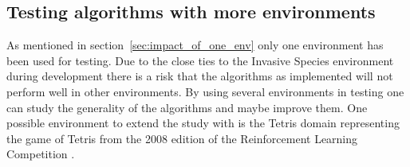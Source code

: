 \subsection{Testing algorithms with more environments}

As mentioned in section~\ref{sec:impact_of_one_env} only one environment has been
used for testing. Due to the close ties to the Invasive Species environment
during development there is a risk that the algorithms as implemented will not
perform well in other environments. By using several environments in testing
one can study the generality of the algorithms and maybe improve them. One
possible environment to extend the study with is the Tetris domain representing
the game of Tetris from the 2008 edition of the Reinforcement Learning
Competition \parencite{whiteson2010reinforcement}.  
